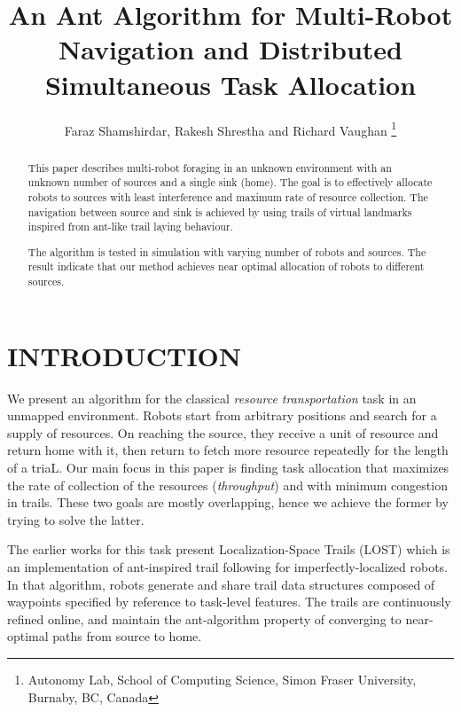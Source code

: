 \documentclass[letterpaper, 10 pt, conference]{ieeeconf}  %
\title{\LARGE \bf
An Ant Algorithm for Multi-Robot Navigation and Distributed Simultaneous Task Allocation
}
\author{Faraz Shamshirdar, Rakesh Shrestha and Richard Vaughan %
\thanks{Autonomy Lab, School of Computing Science, Simon Fraser University,
        Burnaby, BC, Canada
     }%
}
\begin{document}
\maketitle
\thispagestyle{empty}
\pagestyle{empty}


\begin{abstract}
This paper describes multi-robot foraging in an unknown environment with an unknown number of sources and a single sink (home). The goal is to effectively allocate robots to sources with least interference and maximum rate of resource collection. The navigation between source and sink is achieved by using trails of virtual landmarks inspired from ant-like trail laying behaviour.

The algorithm is tested in simulation with varying number of robots and sources. The result indicate that our method achieves near optimal allocation of robots to different sources.

\end{abstract}


\section{INTRODUCTION}

We present an algorithm for the classical \emph{resource transportation} task in an unmapped environment. Robots start from arbitrary positions and search for a supply of resources.  On reaching the source, they receive a unit of resource and return home with it, then return to fetch more resource repeatedly for the length of a triaL.
Our main focus in this paper is finding task allocation that maximizes the rate of collection of the resources (\emph{throughput}) and with minimum congestion in trails. These two goals are mostly overlapping, hence we achieve the former by trying to solve the latter.

The earlier works \cite{LOST} for this task present Localization-Space Trails (LOST)  which is an implementation of ant-inspired trail following for imperfectly-localized robots. In that algorithm, robots generate and share trail data structures composed of waypoints specified by reference to task-level features. The trails are continuously refined online, and maintain the ant-algorithm property \cite{dorigo1992} of converging to  near-optimal paths from source to home.
\end{document}
